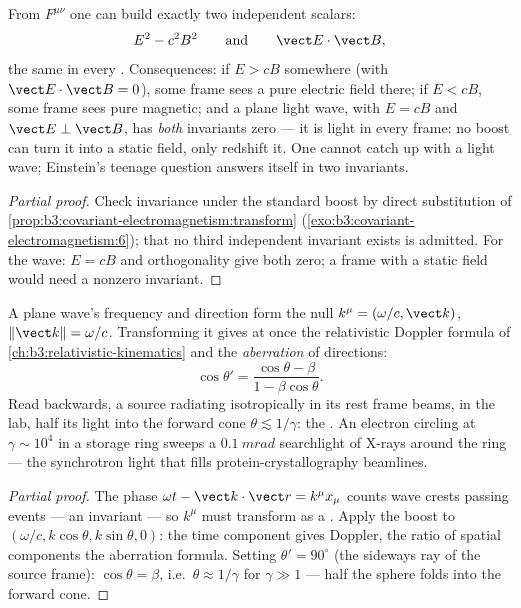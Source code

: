 \begin{proposition}\label{prop:b3:covariant-electromagnetism:invariants}
From $F^{\mu\nu}$ one can build exactly two independent scalars:
\[
E^2 - c^2B^2
\qquad\text{and}\qquad
\vect E\cdot\vect B ,
\]
the same in every . Consequences: if $E > cB$ somewhere
(with $\vect E\cdot\vect B = 0$), some frame sees a pure electric
field there; if $E < cB$, some frame sees pure magnetic; and a plane
light wave, with $E = cB$ and $\vect E\perp\vect B$, has \emph{both}
invariants zero --- it is light in every frame: no boost can turn it
into a static field, only redshift it. One cannot catch up with a
light wave; Einstein's teenage question answers itself in two
invariants.
\end{proposition}

\begin{proof}[Partial proof]
Check invariance under the standard boost by direct substitution of
\cref{prop:b3:covariant-electromagnetism:transform}
(\cref{exo:b3:covariant-electromagnetism:6}); that no third
independent invariant exists is admitted. For the wave: $E = cB$ and
orthogonality give both zero; a frame with a static field would need
a nonzero invariant.
\end{proof}

\begin{proposition}\label{prop:b3:covariant-electromagnetism:wavevector}
A plane wave's frequency and direction form the null 
$k^\mu = (\omega/c, \vect k)$, $\|\vect k\| = \omega/c$. Transforming
it gives at once the relativistic Doppler formula of
\cref{ch:b3:relativistic-kinematics} and the \emph{aberration} of
directions:
\[
\cos\theta' = \frac{\cos\theta - \beta}{1 - \beta\cos\theta} .
\]
Read backwards, a source radiating isotropically in its rest frame
beams, in the lab, half its light into the forward cone $\theta
\lesssim 1/\gamma$: the \emph{}. An electron circling
at $\gamma \sim 10^4$ in a storage ring sweeps a
$\qty{0.1}{mrad}$ searchlight of X-rays around the ring --- the
synchrotron light that fills protein-crystallography beamlines.
\end{proposition}

\begin{proof}[Partial proof]
The phase $\omega t - \vect k\cdot\vect r = k^\mu x_\mu$ counts wave
crests passing events --- an invariant --- so $k^\mu$ must transform
as a . Apply the boost to $(\omega/c, k\cos\theta,
k\sin\theta, 0)$: the time component gives Doppler, the ratio of
spatial components the aberration formula. Setting $\theta' =
90^\circ$ (the sideways ray of the source frame): $\cos\theta =
\beta$, i.e.\ $\theta \approx 1/\gamma$ for $\gamma \gg 1$ --- half
the sphere folds into the forward cone.
\end{proof}

